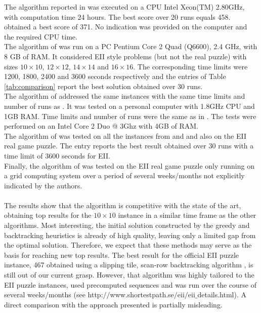 \documentclass[preprint,12pt]{elsarticle}
\begin{document}
The algorithm reported in \cite{SD08} was executed on a CPU Intel Xeon(TM)
2.80GHz, with computation time 24 hours. The best score over 20 runs equals 458.\\
\cite{MGS09} obtained a best score of 371. No indication was provided on the computer and the required CPU time.\\
The algorithm of \cite{CCCHSO10} 
was run on a PC Pentium Core 2 Quad (Q6600), 2.4 GHz, with 8 GB of RAM.  It
 considered EII style problems (but not the real puzzle) with sizes 
$10\times 10$, $12\times 12$, $14\times 14$ and $16\times 16$.
The corresponding time limits were 1200, 1800, 2400 and 3600 seconds respectively
and the entries of Table \ref{tab:comparison} report the best solution obtained over 30 runs.\\
The algorithm of \cite{WC10} addressed the same instances with the same time limits and number of runs as \cite{CCCHSO10}. It was tested on a 
personal computer with 1.8GHz CPU and 1GB RAM.
Time limits and number of runs were the same as in \cite{WC10}. The tests were performed on an  Intel Core 2 Duo @ 3Ghz with 4GB of RAM.\\
The algorithm of \cite{WVV12} was tested on all the instances from 
\cite{CCCHSO10} and \cite{WC10} and also on the  EII real game puzzle.
The entry reports the best result obtained over 30 runs with a time limit of 3600 seconds for EII.\\
Finally, the algorithm of \cite{VE08} was tested on the  EII real game puzzle only running on a grid computing system
over a period of several weeks/months not explicitly indicated by the authors.
\\
\\
The results show that the algorithm is competitive with the state of the art, obtaining top results for the $10\times 10$  instance in a similar time frame as the other algorithms.
Most interesting, the initial solution constructed by the greedy and backtracking heuristics is already of high quality, leaving only a limited gap from the optimal solution.
Therefore, we expect that these methods may serve as the basis for reaching new top results.
The best result for the official EII puzzle instance, 467 obtained using a slipping tile, scan-row backtracking algorithm \citep{VE08}, is still out of our current grasp.
However, that algorithm was highly tailored to the EII puzzle instances, used precomputed sequences and was run over the course of several weeks/months 
(see 
http:$//$www.shortestpath.se$/$eii$/$eii$\_$details.html).
A direct comparison with the approach presented is partially misleading.
\end{document}
